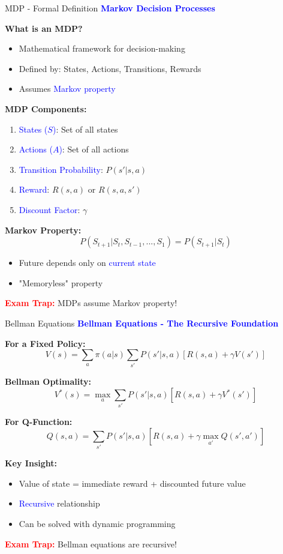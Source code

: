 \documentclass[8pt]{beamer}
\begin{document}
	\begin{frame}{MDP - Formal Definition}
		\fontsize{6.5}{7.5}\selectfont
		\textcolor{blue}{\textbf{Markov Decision Processes}}
		
		\textbf{What is an MDP?}
		\begin{itemize}
			\item Mathematical framework for decision-making
			\item Defined by: States, Actions, Transitions, Rewards
			\item Assumes \textcolor{blue}{Markov property}
		\end{itemize}
		
		\textbf{MDP Components:}
		\begin{enumerate}
			\item \textcolor{blue}{States ($S$)}: Set of all states
			\item \textcolor{blue}{Actions ($A$)}: Set of all actions
			\item \textcolor{blue}{Transition Probability}: $P(s'|s,a)$
			\item \textcolor{blue}{Reward}: $R(s,a)$ or $R(s,a,s')$
			\item \textcolor{blue}{Discount Factor}: $\gamma$
		\end{enumerate}
		
		\textbf{Markov Property:}
		\[
		P(S_{t+1}|S_t, S_{t-1}, ..., S_1) = P(S_{t+1}|S_t)
		\]
		\begin{itemize}
			\item Future depends only on \textcolor{blue}{current state}
			\item "Memoryless" property
		\end{itemize}
		
		\textcolor{red}{\textbf{Exam Trap:}} MDPs assume Markov property!
	\end{frame}
	
	\begin{frame}{Bellman Equations}
		\fontsize{6.5}{7.5}\selectfont
		\textcolor{blue}{\textbf{Bellman Equations - The Recursive Foundation}}
		
		\textbf{For a Fixed Policy:}
		\[
		V(s) = \sum_a \pi(a|s) \sum_{s'} P(s'|s,a) [R(s,a) + \gamma V(s')]
		\]
		
		\textbf{Bellman Optimality:}
		\[
		V^*(s) = \max_a \sum_{s'} P(s'|s,a) [R(s,a) + \gamma V^*(s')]
		\]
		
		\textbf{For Q-Function:}
		\[
		Q(s,a) = \sum_{s'} P(s'|s,a) [R(s,a) + \gamma \max_{a'} Q(s',a')]
		\]
		
		\textbf{Key Insight:}
		\begin{itemize}
			\item Value of state = immediate reward + discounted future value
			\item \textcolor{blue}{Recursive} relationship
			\item Can be solved with dynamic programming
		\end{itemize}
		
		\textcolor{red}{\textbf{Exam Trap:}} Bellman equations are recursive!
	\end{frame}
	
\end{document}
